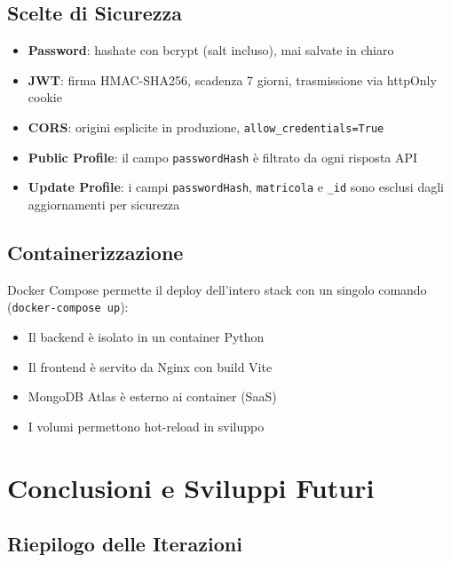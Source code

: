 \documentclass[a4paper,12pt]{report}
\begin{document}
\section{Scelte di Sicurezza}

\begin{itemize}
    \item \textbf{Password}: hashate con bcrypt (salt incluso), mai salvate in chiaro
    \item \textbf{JWT}: firma HMAC-SHA256, scadenza 7 giorni, trasmissione via httpOnly cookie
    \item \textbf{CORS}: origini esplicite in produzione, \texttt{allow\_credentials=True}
    \item \textbf{Public Profile}: il campo \texttt{passwordHash} è filtrato da ogni risposta API
    \item \textbf{Update Profile}: i campi \texttt{passwordHash}, \texttt{matricola} e \texttt{\_id} sono esclusi dagli aggiornamenti per sicurezza
\end{itemize}

\section{Containerizzazione}

Docker Compose permette il deploy dell'intero stack con un singolo comando (\texttt{docker-compose up}):
\begin{itemize}
    \item Il backend è isolato in un container Python
    \item Il frontend è servito da Nginx con build Vite
    \item MongoDB Atlas è esterno ai container (SaaS)
    \item I volumi permettono hot-reload in sviluppo
\end{itemize}


\chapter{Conclusioni e Sviluppi Futuri}

\section{Riepilogo delle Iterazioni}
\end{document}
